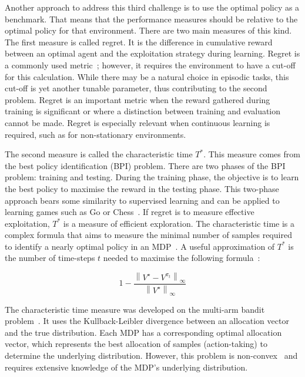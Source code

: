 \documentclass[]{final_report}
\begin{document}
Another approach to address this third challenge is to use the optimal policy as a benchmark. That means that the performance measures should be relative to the optimal policy for that environment. There are two main measures of this kind. The first measure is called regret. It is the difference in cumulative reward between an optimal agent and the exploitation strategy during learning. Regret is a commonly used metric~\cite{modelFree}; however, it requires the environment to have a cut-off for this calculation. While there may be a natural choice in episodic tasks, this cut-off is yet another tunable parameter, thus contributing to the second problem. Regret is an important metric when the reward gathered during training is significant or where a distinction between training and evaluation cannot be made. Regret is especially relevant when continuous learning is required, such as for non-stationary environments. 



\label{bpi-introduction}
The second measure is called the characteristic time $T^*$. This measure comes from the best policy identification (BPI) problem. There are two phases of the BPI problem: training and testing. During the training phase, the objective is to learn the best policy to maximise the reward in the testing phase. This two-phase approach bears some similarity to supervised learning and can be applied to learning games such as Go or Chess~\cite{bestPolicyIdentifaction}. If regret is to measure effective exploitation, $T^*$ is a measure of efficient exploration. The characteristic time is a complex formula that aims to measure the minimal number of samples required to identify a nearly optimal policy in an MDP~\cite{characteristicTime}. A useful approximation of $T^*$ is the number of time-steps $t$ needed to maximise the following formula~\cite{modelFree}:

\begin{equation}
  1- \frac{ \left\|V^\star-V^{\pi_t} \right\|_\infty}{\left\|V^\star\right\|_\infty}
  \label{eqn:characteristic-time-aproximation}
\end{equation}
 
The characteristic time measure was developed on the multi-arm bandit problem~\cite{characteristicTime}. It uses the Kullback-Leibler divergence between an allocation vector and the true distribution. Each MDP has a corresponding optimal allocation vector, which represents the best allocation of samples (action-taking) to determine the underlying distribution. However, this problem is non-convex~\cite{characteristicTimeNonConvex} and requires extensive knowledge of the MDP's underlying distribution.
\end{document}
